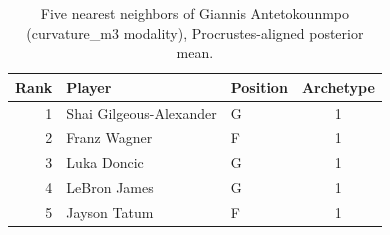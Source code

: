 \begin{table}[htbp]
  \centering\small
  \begin{tabular}{rllc}
    \toprule
    Rank & Player & Position & Archetype \\
    \midrule
    1 & Shai Gilgeous-Alexander & G & 1 \\
    2 & Franz Wagner & F & 1 \\
    3 & Luka Doncic & G & 1 \\
    4 & LeBron James & G & 1 \\
    5 & Jayson Tatum & F & 1 \\
    \bottomrule
  \end{tabular}
  \caption{Five nearest neighbors of Giannis Antetokounmpo (curvature_m3 modality), Procrustes-aligned posterior mean.}
  \label{tab:Giannis_Antetokounmpo_neighbors_curvature_m3}
\end{table}

